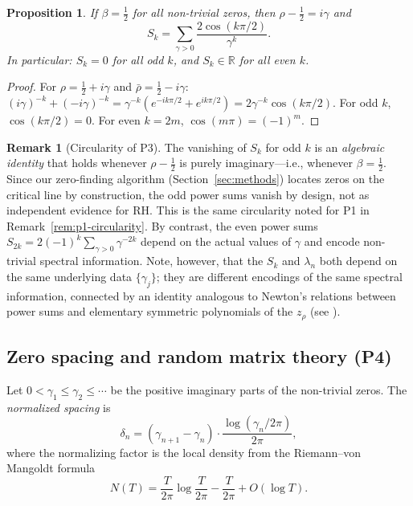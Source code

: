 \documentclass[11pt,a4paper]{article}
\newtheorem{proposition}[theorem]{Proposition}
\theoremstyle{definition}
\newtheorem{remark}[theorem]{Remark}
\newcommand{\RR}{\mathbb{R}}
\begin{document}
\begin{proposition}\label{prop:sk-symmetry}
If $\beta = \tfrac{1}{2}$ for all non-trivial zeros, then $\rho - \tfrac{1}{2} = i\gamma$ and
\begin{equation}\label{eq:sk-formula}
  S_k = \sum_{\gamma > 0} \frac{2\cos(k\pi/2)}{\gamma^k}.
\end{equation}
In particular: $S_k = 0$ for all odd $k$, and $S_k \in \RR$ for all even $k$.
\end{proposition}

\begin{proof}
For $\rho = \tfrac{1}{2} + i\gamma$ and $\bar{\rho} = \tfrac{1}{2} - i\gamma$: $(i\gamma)^{-k} + (-i\gamma)^{-k} = \gamma^{-k}(e^{-ik\pi/2} + e^{ik\pi/2}) = 2\gamma^{-k}\cos(k\pi/2)$.
For odd $k$, $\cos(k\pi/2) = 0$. For even $k = 2m$, $\cos(m\pi) = (-1)^m$.
\end{proof}

\begin{remark}[Circularity of P3]\label{rem:p3-circularity}
The vanishing of $S_k$ for odd $k$ is an \emph{algebraic identity} that holds whenever $\rho - \tfrac{1}{2}$ is purely imaginary---i.e., whenever $\beta = \tfrac{1}{2}$. Since our zero-finding algorithm (Section~\ref{sec:methods}) locates zeros on the critical line by construction, the odd power sums vanish by design, not as independent evidence for RH. This is the same circularity noted for P1 in Remark~\ref{rem:p1-circularity}. By contrast, the even power sums $S_{2k} = 2(-1)^k \sum_{\gamma > 0} \gamma^{-2k}$ depend on the actual values of $\gamma$ and encode non-trivial spectral information. Note, however, that the $S_k$ and $\lambda_n$ both depend on the same underlying data $\{\gamma_j\}$; they are different encodings of the same spectral information, connected by an identity analogous to Newton's relations between power sums and elementary symmetric polynomials of the $z_\rho$ (see \cite[{\S}4]{BombieriLagarias1999}).
\end{remark}

\subsection{Zero spacing and random matrix theory (P4)}

Let $0 < \gamma_1 \leq \gamma_2 \leq \cdots$ be the positive imaginary parts of the non-trivial zeros. The \emph{normalized spacing} is
\begin{equation}\label{eq:normalized-spacing}
  \delta_n = (\gamma_{n+1} - \gamma_n) \cdot \frac{\log(\gamma_n / 2\pi)}{2\pi},
\end{equation}
where the normalizing factor is the local density from the Riemann--von Mangoldt formula
\begin{equation}
  N(T) = \frac{T}{2\pi}\log\frac{T}{2\pi} - \frac{T}{2\pi} + O(\log T).
\end{equation}
\end{document}
